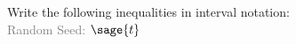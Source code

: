 \documentclass{article}%
\begin{document}

\noindent Write the following inequalities in interval notation: \\
\textcolor{gray}{Random Seed: $\sage{t}$}


\begin{multicols}{3}
\begin{enumerate}
\end{enumerate}
\end{multicols}


\newpage


\begin{multicols}{3}
\begin{enumerate}
\end{enumerate}
\end{multicols}
\end{document}
